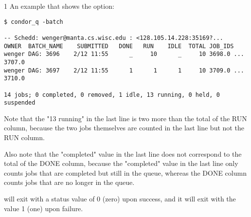 \begin{ManPage}{\label{man-condor-q}}{1}
An example that shows the  option:
\footnotesize
\begin{verbatim}
$ condor_q -batch

-- Schedd: wenger@manta.cs.wisc.edu : <128.105.14.228:35169?...
OWNER  BATCH_NAME    SUBMITTED   DONE   RUN    IDLE  TOTAL JOB_IDS
wenger DAG: 3696    2/12 11:55      _     10      _     10 3698.0 ... 3707.0
wenger DAG: 3697    2/12 11:55      1      1      1     10 3709.0 ... 3710.0

14 jobs; 0 completed, 0 removed, 1 idle, 13 running, 0 held, 0 suspended
\end{verbatim}
\normalsize

Note that the "13 running" in the last line is two more than the
total of the RUN column, because the two  jobs
themselves are counted in the last line but not the RUN column.

Also note that the "completed" value in the last line does not
correspond to the total of the DONE column, because the "completed"
value in the last line only counts jobs that are completed but still
in the queue, whereas the DONE column counts jobs that are no
longer in the queue.

\ExitStatus

 will exit with a status value of 0 (zero) upon success,
and it will exit with the value 1 (one) upon failure.

\end{ManPage}
